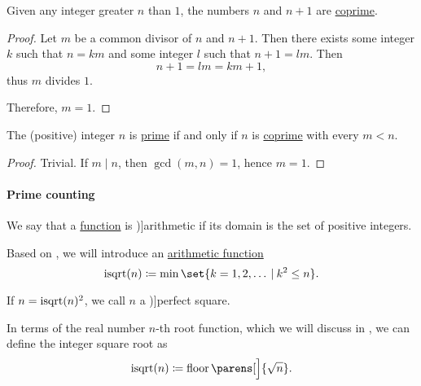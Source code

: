 \begin{proposition}\label{thm:n_plus_1_coprime}
  Given any integer greater \( n \) than \( 1 \), the numbers \( n \) and \( n + 1 \) are \hyperref[def:coprime_elements]{coprime}.
\end{proposition}
\begin{proof}
  Let \( m \) be a common divisor of \( n \) and \( n + 1 \). Then there exists some integer \( k \) such that \( n = km \) and some integer \( l \) such that \( n + 1 = lm \). Then
  \begin{equation*}
    n + 1 = lm = km + 1,
  \end{equation*}
  thus \( m \) divides \( 1 \).

  Therefore, \( m = 1 \).
\end{proof}

\begin{proposition}\label{thm:primality_via_coprimality}
  The (positive) integer \( n \) is \hyperref[def:prime_number]{prime} if and only if \( n \) is \hyperref[def:coprime_numbers]{coprime} with every \( m < n \).
\end{proposition}
\begin{proof}
  \SufficiencySubProof Trivial.
  \NecessitySubProof If \( m \mid n \), then \( \gcd(m, n) = 1 \), hence \( m = 1 \).
\end{proof}

\paragraph{Prime counting}

\begin{definition}\label{def:arithmetic_function}
  We say that a \hyperref[def:function]{function} is \term[en=arithmetical function (\cite[24]{Apostol1976AnalyticNumberTheory})]{arithmetic} if its domain is the set of positive integers.
\end{definition}

\begin{definition}\label{def:int_sqrt}\mimprovised
  Based on \cite{PythonDocs:3.12:math}, we will introduce an  \hyperref[def:arithmetic_function]{arithmetic function}
  \begin{equation*}
    \op{isqrt}(n) \coloneqq \min\set{ k = 1, 2, \ldots \given k^2 \leq n }.
  \end{equation*}

  If \( n = \op{isqrt}(n)^2 \), we call \( n \) a \term[en=perfect square (\cite[example 1.7.1]{Rosen2019DiscreteMathematics})]{perfect square}.
\end{definition}
\begin{comments}
  \item In terms of the real number \( n \)-th root function, which we will discuss in , we can define the integer square root as
  \begin{equation*}
    \op{isqrt}(n) \coloneqq \floor\parens[\Big]{ \sqrt{n} }.
  \end{equation*}
\end{comments}

